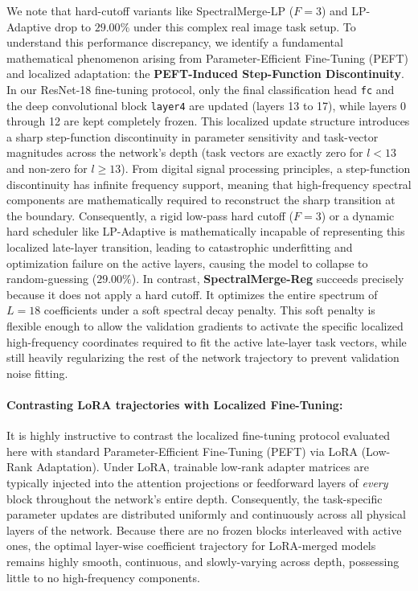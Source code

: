 We note that hard-cutoff variants like SpectralMerge-LP ($F=3$) and LP-Adaptive drop to $29.00\%$ under this complex real image task setup. To understand this performance discrepancy, we identify a fundamental mathematical phenomenon arising from Parameter-Efficient Fine-Tuning (PEFT) and localized adaptation: the \textbf{PEFT-Induced Step-Function Discontinuity}. 
In our ResNet-18 fine-tuning protocol, only the final classification head \texttt{fc} and the deep convolutional block \texttt{layer4} are updated (layers 13 to 17), while layers 0 through 12 are kept completely frozen. This localized update structure introduces a sharp step-function discontinuity in parameter sensitivity and task-vector magnitudes across the network's depth (task vectors are exactly zero for $l < 13$ and non-zero for $l \ge 13$).
From digital signal processing principles, a step-function discontinuity has infinite frequency support, meaning that high-frequency spectral components are mathematically required to reconstruct the sharp transition at the boundary. Consequently, a rigid low-pass hard cutoff ($F=3$) or a dynamic hard scheduler like LP-Adaptive is mathematically incapable of representing this localized late-layer transition, leading to catastrophic underfitting and optimization failure on the active layers, causing the model to collapse to random-guessing ($29.00\%$).
In contrast, \textbf{SpectralMerge-Reg} succeeds precisely because it does not apply a hard cutoff. It optimizes the entire spectrum of $L=18$ coefficients under a soft spectral decay penalty. This soft penalty is flexible enough to allow the validation gradients to activate the specific localized high-frequency coordinates required to fit the active late-layer task vectors, while still heavily regularizing the rest of the network trajectory to prevent validation noise fitting.

\paragraph{Contrasting LoRA trajectories with Localized Fine-Tuning:}
It is highly instructive to contrast the localized fine-tuning protocol evaluated here with standard Parameter-Efficient Fine-Tuning (PEFT) via LoRA (Low-Rank Adaptation). Under LoRA, trainable low-rank adapter matrices are typically injected into the attention projections or feedforward layers of \emph{every} block throughout the network's entire depth. Consequently, the task-specific parameter updates are distributed uniformly and continuously across all physical layers of the network. Because there are no frozen blocks interleaved with active ones, the optimal layer-wise coefficient trajectory for LoRA-merged models remains highly smooth, continuous, and slowly-varying across depth, possessing little to no high-frequency components. 


